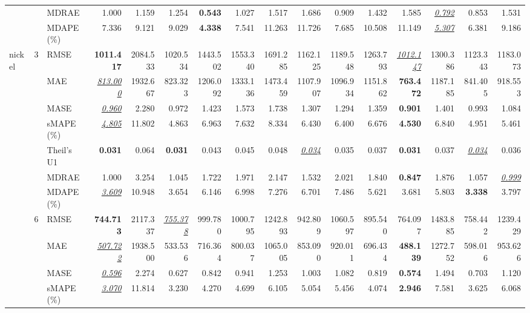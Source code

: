 \begin{table}[!htbp]
{\begin{tabular}{lllrrrrrrrrrrrrr}
 &  & MDRAE & 1.000 & 1.159 & 1.254 & \textbf{0.543} & 1.027 & 1.517 & 1.686 & 0.909 & 1.432 & 1.585 & \underline{\textit{0.792}} & 0.853 & 1.531 \\
 &  & MDAPE (\%) & 7.336 & 9.121 & 9.029 & \textbf{4.338} & 7.541 & 11.263 & 11.726 & 7.685 & 10.508 & 11.149 & \underline{\textit{5.307}} & 6.381 & 9.186 \\
\midrule
nickel & 3 & RMSE & \textbf{1011.417} & 2084.533 & 1020.534 & 1443.502 & 1553.340 & 1691.285 & 1162.125 & 1189.548 & 1263.793 & \underline{\textit{1012.147}} & 1300.386 & 1123.343 & 1183.073 \\
 &  & MAE & \underline{\textit{813.000}} & 1932.667 & 823.323 & 1206.092 & 1333.136 & 1473.459 & 1107.907 & 1096.934 & 1151.862 & \textbf{763.472} & 1187.185 & 841.405 & 918.553 \\
 &  & MASE & \underline{\textit{0.960}} & 2.280 & 0.972 & 1.423 & 1.573 & 1.738 & 1.307 & 1.294 & 1.359 & \textbf{0.901} & 1.401 & 0.993 & 1.084 \\
 &  & sMAPE (\%) & \underline{\textit{4.805}} & 11.802 & 4.863 & 6.963 & 7.632 & 8.334 & 6.430 & 6.400 & 6.676 & \textbf{4.530} & 6.840 & 4.951 & 5.461 \\
 &  & Theil's U1 & \textbf{0.031} & 0.064 & \textbf{0.031} & 0.043 & 0.045 & 0.048 & \underline{\textit{0.034}} & 0.035 & 0.037 & \textbf{0.031} & 0.037 & \underline{\textit{0.034}} & 0.036 \\
 &  & MDRAE & 1.000 & 3.254 & 1.045 & 1.722 & 1.971 & 2.147 & 1.532 & 2.021 & 1.840 & \textbf{0.847} & 1.876 & 1.057 & \underline{\textit{0.999}} \\
 &  & MDAPE (\%) & \underline{\textit{3.609}} & 10.948 & 3.654 & 6.146 & 6.998 & 7.276 & 6.701 & 7.486 & 5.621 & 3.681 & 5.803 & \textbf{3.338} & 3.797 \\
\cmidrule(lr){2-16}
 & 6 & RMSE & \textbf{744.713} & 2117.337 & \underline{\textit{755.378}} & 999.780 & 1000.795 & 1242.893 & 942.809 & 1060.597 & 895.540 & 764.097 & 1483.885 & 758.442 & 1239.429 \\
 &  & MAE & \underline{\textit{507.722}} & 1938.500 & 533.536 & 716.364 & 800.037 & 1065.005 & 853.090 & 920.011 & 696.434 & \textbf{488.139} & 1272.752 & 598.016 & 953.626 \\
 &  & MASE & \underline{\textit{0.596}} & 2.274 & 0.627 & 0.842 & 0.941 & 1.253 & 1.003 & 1.082 & 0.819 & \textbf{0.574} & 1.494 & 0.703 & 1.120 \\
 &  & sMAPE (\%) & \underline{\textit{3.070}} & 11.814 & 3.230 & 4.270 & 4.699 & 6.105 & 5.054 & 5.456 & 4.074 & \textbf{2.946} & 7.581 & 3.625 & 6.068 \\

\end{tabular}}
\end{table}
